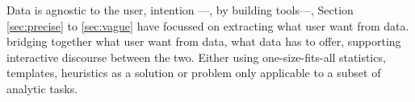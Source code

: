 Data is agnostic to the user, intention ---, by building tools---, Section \ref{sec:precise} to \ref{sec:vague} have focussed on extracting what user want from data. bridging together what user want from data, what data has to offer, supporting interactive discourse between the two. 
 Either using one-size-fits-all statistics, templates, heuristics as a solution or problem only applicable to a subset of analytic tasks\cite{Vartak2015,Vartak2017}. 
